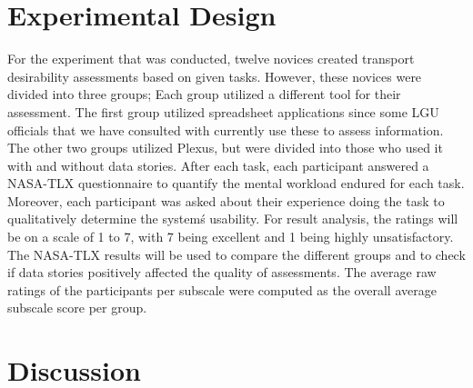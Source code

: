 \documentclass{sigchi}
\begin{document}
\section{Experimental Design}
For the experiment that was conducted, twelve novices created transport desirability assessments based on given tasks. However, these novices were divided into three groups; Each group utilized a different tool for their assessment. The first group utilized spreadsheet applications since some LGU officials that we have consulted with currently use these to assess information. The other two groups utilized Plexus, but were divided into those who used it with and without data stories. After each task, each participant answered a NASA-TLX questionnaire to quantify the mental workload endured for each task. Moreover, each participant was asked about their experience doing the task to qualitatively determine the system\'s usability. For result analysis, the ratings will be on a scale of 1 to 7, with 7 being excellent and 1 being highly unsatisfactory. The NASA-TLX results will be used to compare the different groups and to check if data stories positively affected the quality of assessments. The average raw ratings of the participants per subscale were computed as the overall average subscale score per group.


\section{Discussion}
\end{document}
